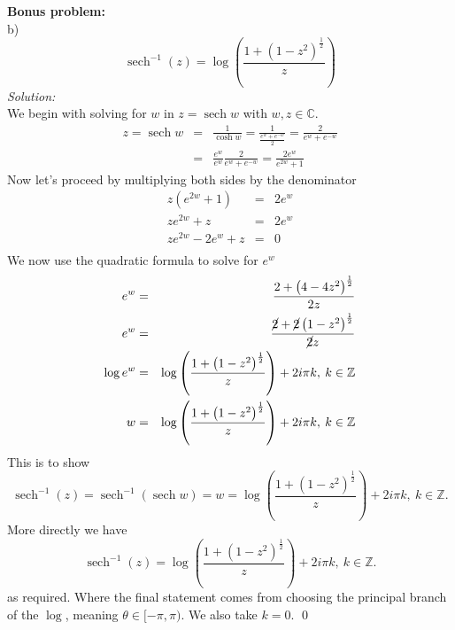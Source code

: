 \documentclass[10pt]{amsart}
\DeclareMathOperator{\sech}{sech}
\theoremstyle{nonumberplain}
\begin{document}
\noindent
\textbf{Bonus problem:} \\
b) $$\sech^{-1}(z) = \log \left(\frac{1 + (1 - z^2)^{\frac{1}{2}}}{z}\right)$$
\textit{Solution:} \\
We begin with solving for $w$ in $z = \sech{w}$ with $w, z \in \mathbb{C}$. 
\begin{eqnarray*}
z = \sech{w} &=& \frac{1}{\cosh w} = \frac{1}{\frac{e^{w} + e^{-w}}{2}} = \frac{2}{e^{w} + e^{-w}} \\
	  &=& \frac{e^{w}}{e^{w}} \frac{2}{e^{w} + e^{-w}} = \frac{ 2e^{w}}{ e^{2w} + 1 }
\end{eqnarray*}
Now let's proceed by multiplying both sides by the denominator
\begin{eqnarray*}
z\left( e^{2w} + 1 \right) &=&  2e^{w}\\
ze^{2w} + z &=&  2e^{w}\\
ze^{2w} - 2e^{w}+ z &=&  0\\
\end{eqnarray*}
We now use the quadratic formula to solve for $e^{w}$
\begin{eqnarray*}
e^{w} &=& \frac{2 + \left(4 - 4z^2\right)^{\frac{1}{2}}}{2z} \\
e^{w} &=& \frac{\cancel2 + \cancel2\left(1 - z^2\right)^{\frac{1}{2}}}{\cancel2z} \\
\log e^{w} &=& \log\left(\frac{1 + \left(1 - z^2\right)^{\frac{1}{2}}}{z} \right) + 2i\pi k, \: k \in \mathbb{Z} \\
w &=& \log\left(\frac{1 + \left(1 - z^2\right)^{\frac{1}{2}}}{z} \right) + 2i\pi k, \: k \in \mathbb{Z} \\
\end{eqnarray*}
This is to show
$$\sech^{-1}(z) = \sech^{-1}(\sech w) = w = \log\left(\frac{1 + \left(1 - z^2\right)^{\frac{1}{2}}}{z} \right) + 2i\pi k, \: k \in \mathbb{Z}.$$
More directly we have 
$$\sech^{-1}(z) = \log\left(\frac{1 + \left(1 - z^2\right)^{\frac{1}{2}}}{z} \right) + 2i\pi k, \: k \in \mathbb{Z}.$$
as required. 
Where the final statement comes from choosing the principal branch of the $\log$, meaning $\theta \in [-\pi, \pi)$.
We also take $k = 0$.
\qed \\
\end{document}
